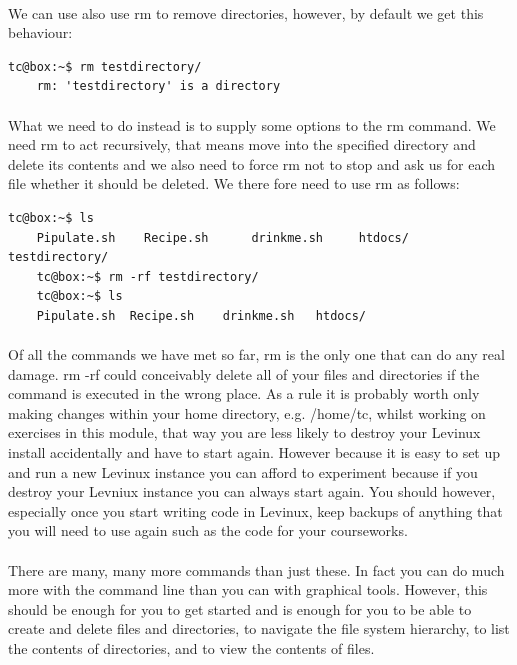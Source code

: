 \documentclass[12pt, a4paper, twoside]{book}
\begin{document}
\paragraph{} We can use also use rm to remove directories, however, by default we get this behaviour:
\begin{lstlisting}[style=DOS]
    tc@box:~$ rm testdirectory/
    rm: 'testdirectory' is a directory
\end{lstlisting}
\paragraph{} What we need to do instead is to supply some options to the rm command. We need rm to act recursively, that means move into the specified directory and delete its contents and we also need to force rm not to stop and ask us for each file whether it should be deleted. We there fore need to use rm as follows:
\begin{lstlisting}[style=DOS]
    tc@box:~$ ls
    Pipulate.sh    Recipe.sh      drinkme.sh     htdocs/        testdirectory/
    tc@box:~$ rm -rf testdirectory/
    tc@box:~$ ls
    Pipulate.sh  Recipe.sh    drinkme.sh   htdocs/
\end{lstlisting}
\paragraph{} Of all the commands we have met so far, rm is the only one that can do any real damage. rm -rf could conceivably delete all of your files and directories if the command is executed in the wrong place. As a rule it is probably worth only making changes within your home directory, e.g. /home/tc, whilst working on exercises in this module, that way you are less likely to destroy your Levinux install accidentally and have to start again. However because it is easy to set up and run a new Levinux instance you can afford to experiment because if you destroy your Levniux instance you can always start again. You should however, especially once you start writing code in Levinux, keep backups of anything that you will need to use again such as the code for your courseworks.

\paragraph{} There are many, many more commands than just these. In fact you can do much more with the command line than you can with graphical tools. However, this should be enough for you to get started and is enough for you to be able to create and delete files and directories, to navigate the file system hierarchy, to list the contents of directories, and to view the contents of files. 
\end{document}
